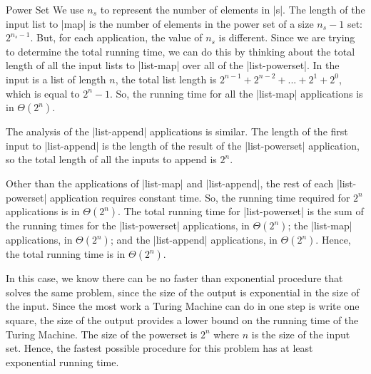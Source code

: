 \begin{schemeregion}
\begin{example}{Power Set}
We use $n_s$ to represent the number of elements in \scheme|s|.  The length of the input list to \scheme|map| is the number of elements in the power set of a size $n_s-1$ set: $2^{n_s-1}$.  But, for each application, the value of $n_s$ is different.  Since we are trying to determine the total running time, we can do this by thinking about the total length of all the input lists to \scheme|list-map| over all of the \scheme|list-powerset|.  In the input is a list of length $n$, the total list length is
$2^{n-1} + 2^{n - 2} + ... + 2^1 + 2^0$, which is equal to $2^{n}-1$.  So, the running time for all the \scheme|list-map| applications is in $\Theta(2^n)$.  

The analysis of the \scheme|list-append| applications is similar.  The length of the first input to \scheme|list-append| is the length of the result of the \scheme|list-powerset| application, so the total length of all the inputs to append is $2^n$.  

Other than the applications of \scheme|list-map| and \scheme|list-append|, the rest of each \scheme|list-powerset| application requires constant time.  So, the running time required for $2^n$ applications is in $\Theta(2^n)$.  The total running time for \scheme|list-powerset| is the sum of the running times for the \scheme|list-powerset| applications, in $\Theta(2^n)$; the \scheme|list-map| applications, in $\Theta(2^n)$; and the \scheme|list-append| applications, in $\Theta(2^n)$.  Hence, the total running time is in $\Theta(2^n)$.

In this case, we know there can be no faster than exponential procedure that solves the same problem, since the size of the output is exponential in the size of the input.  Since the most work a Turing Machine can do in one step is write one square, the size of the output provides a lower bound on the running time of the Turing Machine.  The size of the powerset is $2^n$ where $n$ is the size of the input set.  Hence, the fastest possible procedure for this problem has at least exponential running time.  
\end{example}


\end{schemeregion}

